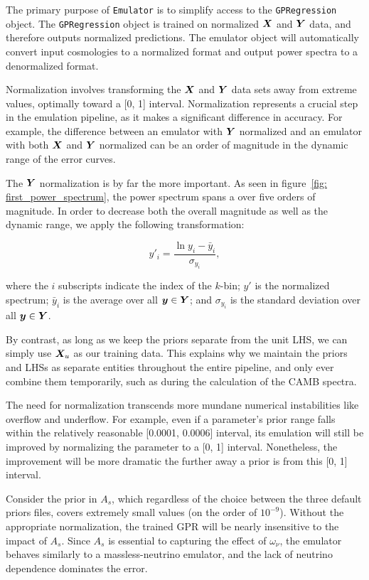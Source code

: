 The primary purpose of \texttt{Emulator} is to simplify access to the
\texttt{GPRegression} object. The \texttt{GPRegression} object is trained on
normalized $\bm{X}$ and $\bm{Y}$ data, and therefore outputs normalized
predictions. The emulator object will automatically convert input cosmologies
to a normalized format and output power spectra to a denormalized format.

Normalization involves transforming the $\bm{X}$ and $\bm{Y}$ data sets
away from extreme values, optimally toward a [0, 1] interval.
Normalization represents a crucial step in the emulation pipeline,
as it makes a significant difference in accuracy. For example, the difference
between an emulator with $\bm{Y}$ normalized and an emulator with
both $\bm{X}$ and $\bm{Y}$ normalized can be an order of magnitude in the
dynamic range of the error curves. 

The $\bm{Y}$ normalization is by far the more important. As seen in
figure~\ref{fig: first_power_spectrum}, the power spectrum spans a over five
orders of magnitude. In order to decrease both the overall magnitude as well
as the dynamic range, we apply the following transformation:

\begin{equation}
\label{eq: y_normalization}
y'_i = \frac{\ln{y_i} - \bar{y}_i}{\sigma_{y_i}}
,\end{equation}

where the $i$ subscripts indicate the index of the $k$-bin; $y'$ is the 
normalized spectrum; $\bar{y}_i$ is the average over all
$\bm{y} \in \bm{Y}$; and $\sigma_{y_i}$ is the 
standard deviation over all $\bm{y} \in \bm{Y}$.

By contrast, as long as we keep the priors separate from the unit LHS, we can
simply use $\bm{X}_u$ as our training data. This explains why we
maintain the priors and LHSs as separate entities throughout the entire
pipeline, and only ever combine them temporarily, such as during the
calculation of the CAMB spectra. 

The need for normalization transcends more mundane numerical instabilities
like overflow and underflow. For example, even if a parameter's 
prior range falls within the relatively reasonable [0.0001, 0.0006] interval, 
its emulation will still be improved by normalizing the parameter to a [0, 1] 
interval. Nonetheless, the improvement will be more dramatic the further away 
a prior is from this [0, 1] interval.

Consider the prior in $A_s$, which 
regardless of the choice between the three default priors files, covers 
extremely small values (on the order of $10^{-9}$). Without the appropriate 
normalization, the trained GPR will be nearly insensitive to the impact of 
$A_s$. Since $A_s$ is essential to capturing the effect of $\omega_\nu$,
the emulator behaves similarly to a massless-neutrino emulator, and the lack 
of neutrino dependence dominates the error.

